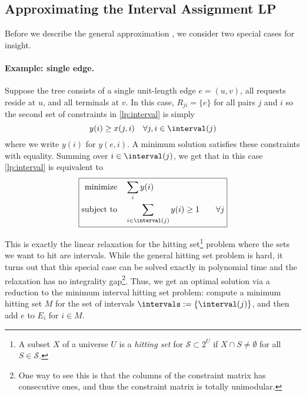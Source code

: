 \subsection{Approximating the Interval Assignment LP}
\label{sec:interval}
Before we describe the general approximation , we consider two special
cases for insight.

\paragraph{Example: single edge.}
Suppose the tree consists of a single unit-length edge $e = (u,v)$,
all requests reside at $u$, and all terminals at $v$. In this case, $R_{ji} = \{e\}$ for all pairs $j$ and $i$ so
the second set of constraints in \eqref{lp:interval} is simply
\[y(i) \geq x(j,i) \quad \forall j, i \in \interval(j)\] where we
write $y(i)$ for $y(e,i)$. A minimum solution satisfies these
constraints with equality. Summing over $i \in \interval(j)$, we get
that in this case \eqref{lp:interval} is equivalent to
\begin{equation*}
\boxed{
\begin{aligned}
  \mbox{minimize}\quad            
  & \sum_i y(i)\\
  \mbox{subject to}\quad  & \sum_{i \in \interval(j)} y(i) \geq 1 &\quad  \forall j
\end{aligned}
}
\end{equation*}

This is exactly the linear relaxation for the hitting set\footnote{A
  subset $X$ of a universe $U$ is a \emph{hitting set} for
  $\mathcal{S} \subset 2^U$ if $X \cap S \neq \emptyset$ for all $S
  \in \mathcal{S}$.} problem where the sets we want to hit are
intervals. While the general hitting set problem is hard, it turns out
that this special case can be solved exactly in polynomial time and
the relaxation has no integrality gap\footnote{One way to see this is
  that the columns of the constraint matrix has consecutive ones, and
  thus the constraint matrix is totally unimodular.}. Thus, we get an
optimal solution via a reduction to the minimum interval hitting set
problem: compute a minimum hitting set $M$ for the set of intervals
$\intervals := \{\interval(j)\}$, and then add $e$ to $E_i$ for $i \in
M$.

